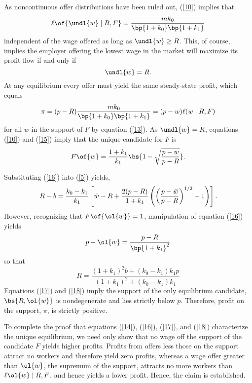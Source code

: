 \documentclass[12pt]{article}
\theoremstyle{definition}
\begin{document}
As noncontinuous offer distributions have been ruled out, (\ref{10}) implies that
\begin{equation}
    \label{13}
    \ell\of{\undl{w} \mid R, F} = \frac{m k_0}{\bp{1+k_0}\bp{1+k_1}}
\end{equation}
independent of the wage offered as long as $\undl{w} \geq R$. This, of course, implies the employer offering the lowest wage in the market will maximize its profit flow if and only if
\begin{equation}
    \label{14}
    \undl{w} = R.
\end{equation}
At any equilibrium every offer must yield the same steady-state profit, which equals 
\begin{equation}
    \label{15}
    \pi=(p-R) \frac{m k_0}{\bp{1+k_0}\bp{1+k_1}} = (p-w) \ell(w \mid R, F)
\end{equation}
for all $w$ in the support of $F$ by equation (\ref{13}). As $\undl{w} = R$, equations (\ref{10}) and (\ref{15}) imply that the unique candidate for $F$ is 
\begin{equation}
    \label{16}
    F\of{w} = \frac{1 + k_1}{k_1} \bs{1 - \sqrt{\frac{p - w}{p - R}}}.
\end{equation}

Substituting (\ref{16}) into (\ref{5}) yields, 
\begin{equation}
    \notag 
    R - b = \frac{k_0-k_1}{k_1}\left[\bar{w}-R+\frac{2(p-R)}{1+k_1}\left(\left(\frac{p-\bar{w}}{p-R}\right)^{1 / 2}-1\right)\right].
\end{equation}
However, recognizing that $F\of{\ol{w}} = 1$, manipulation of equation (\ref{16}) yields 
\begin{equation}
    \label{17}
    p - \ol{w} = \frac{p - R}{\bp{1 + k_1}^2}
\end{equation}
so that 
\begin{equation}
    \label{18} 
    R=\frac{\left(1+k_1\right)^2 b+\left(k_0-k_1\right) k_1 p}{\left(1+k_1\right)^2+\left(k_0-k_1\right) k_1}
\end{equation}
Equations (\ref{17}) and (\ref{18}) imply the support of the only equilibrium candidate, $\bs{R, \ol{w}}$ is nondegenerate and lies strictly below $p$. Therefore, profit on the support, $\pi$, is strictly positive.

To complete the proof that equations (\ref{14}), (\ref{16}), (\ref{17}), and (\ref{18}) characterize the unique equilibrium, we need only show that no wage off the support of the candidate $F$ yields higher profits. Profits from offers less those on the support attract no workers and therefore yield zero profits, whereas a wage offer greater than $\ol{w}$, the supremum of the support, attracts no more workers than $\ell{\ol{w} \mid R, F}$, and hence yields a lower profit. Hence, the claim is established.
\end{document}
